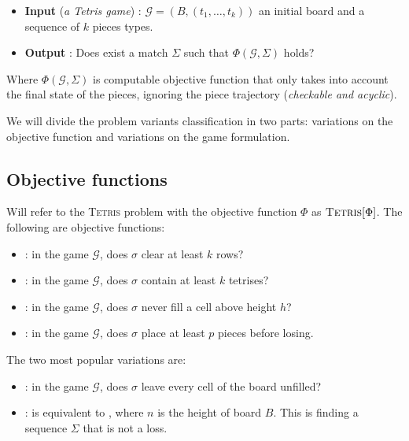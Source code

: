 \begin{itemize}
  \item \textbf{Input} (\textit{a Tetris game}) : $\mathcal{G} = (B,(t_1,\dots,t_k))$ an initial board and a sequence of $k$ pieces types.
  
  \item \textbf{Output} : Does exist a match $\Sigma$ such that $\Phi ( \mathcal{G}, \Sigma )$ holds? 
\end{itemize}

Where $\Phi(\mathcal{G},\Sigma)$ is computable objective function that only takes into account the final state of the pieces, ignoring the piece trajectory (\emph{checkable and acyclic}). 


We will divide the problem variants classification in two parts: variations on the objective function and variations on the game formulation.

\subsection{Objective functions} 

Will refer to the \textsc{Tetris} problem with the objective function $\Phi$ as $\textsc{Tetris} [ \Phi ]$. The following are objective functions:

\begin{itemize}
  \item {}: in the game $\mathcal{G}$, does $\sigma$ clear at least $k$ rows?
  \item {}: in the game $\mathcal{G}$, does $\sigma$ contain at least $k$ tetrises?
  \item {}: in the game $\mathcal{G}$, does $\sigma$ never fill a cell above height $h$?
  \item {}: in the game $\mathcal{G}$, does $\sigma$ place at least $p$ pieces before losing.
\end{itemize} 

The two most popular variations are:

\begin{itemize} 
  \item \clearing: in the game $\mathcal{G}$, does $\sigma$ leave every cell of the board unfilled?
  \item \survival: is equivalent to , where $n$ is the height of board $B$. This is finding a sequence $\Sigma$ that is not a loss.
\end{itemize}

